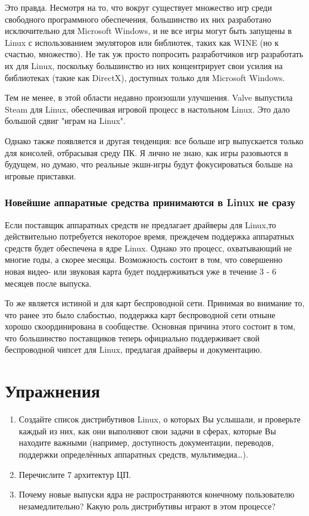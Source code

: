 \documentclass[12pt]{book}
\begin{document}
Это правда. Несмотря на то, что вокруг существует множество игр среди свободного программного обеспечения, большинство их них разработано исключительно для Microsoft Windows, и не все игры могут быть запущены в Linux с использованием эмуляторов или библиотек, таких как WINE (но к счастью, множество). Не так уж просто попросить разработчиков игр разработать их для Linux, поскольку большинство из них концентрирует свои усилия на библиотеках (такие как DirectX), доступных только для Microsoft Windows.

Тем не менее, в этой области недавно произошли улучшения. Valve выпустила Steam для Linux, обеспечивая игровой процесс в настольном Linux. Это дало большой сдвиг "играм на Linux".

Однако также появляется и другая тенденция: все больше игр  выпускается только для консолей, отбрасывая среду ПК. Я лично не знаю, как игры разовьются в будущем, но думаю, что реальные экшн-игры будут фокусироваться больше на игровые приставки.

\subsubsection{Новейшие аппаратные средства принимаются в Linux не сразу}

Если поставщик аппаратных средств не предлагает драйверы для Linux,\quad то действительно потребуется некоторое время, прежде\quad чем поддержка аппаратных средств будет обеспечена в ядре Linux. Однако это процесс, охватывающий не многие годы, а скорее месяцы. Возможность состоит в том, что совершенно новая видео- или звуковая карта будет поддерживаться уже в течение 3 - 6 месяцев после выпуска.

То же является истиной и для карт беспроводной сети. Принимая во внимание то, что ранее это было слабостью, поддержка карт беспроводной сети отныне хорошо скоординирована в сообществе. Основная причина этого состоит в том, что большинство поставщиков теперь официально поддерживает свой беспроводной чипсет для Linux, предлагая драйверы и документацию.

\newpage
{\color{white}\section{Упражнения}}
\begin{tcolorbox}[title=\textbf{Упражнения}, colback=yellow!14!white, colframe=red!75!white]
\begin{enumerate}
	\item Создайте список дистрибутивов Linux, о которых Вы услышали, и проверьте каждый из них, как они выполняют свои задачи в сферах, которые Вы находите важными (например, доступность документации, переводов, поддержки определённых аппаратных средств, мультимедиа\ldots).
	\item Перечислите 7 архитектур ЦП.
	\item Почему новые выпуски ядра не распространяются конечному пользователю незамедлительно? Какую роль дистрибутивы играют в этом процессе?
\end{enumerate}
\end{tcolorbox}
\end{document}
